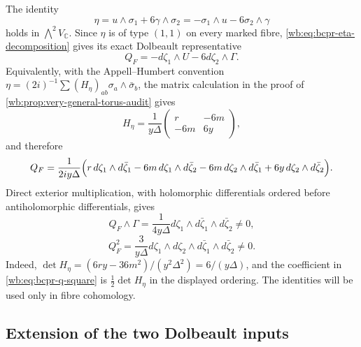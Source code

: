 The identity
\begin{equation}
 \eta=u\wedge\sigma_1+6\gamma\wedge\sigma_2
     =-\sigma_1\wedge u-6\sigma_2\wedge\gamma
\label{wb:eq:bcpr-eta-decomposition}
\end{equation}
holds in $\bigwedge^2V_{\mathbb C}$.  Since $\eta$ is of type $(1,1)$
on every marked fibre, \cref{wb:eq:bcpr-eta-decomposition} gives its exact
Dolbeault representative
\begin{equation}
 Q_F=-d\zeta_1\wedge U-6d\zeta_2\wedge\Gamma.
\label{wb:eq:bcpr-q-fibre}
\end{equation}
Equivalently, with the Appell--Humbert convention
$\eta=(2i)^{-1}\sum(H_\eta)_{ab}\sigma_a\wedge\bar\sigma_b$, the matrix
calculation in the proof of \cref{wb:prop:very-general-torus-audit} gives
\begin{equation}
 H_\eta=\frac1{y\Delta}
 \begin{pmatrix}r&-6m\\-6m&6y\end{pmatrix},
\label{wb:eq:bcpr-appell-humbert-matrix}
\end{equation}
and therefore
\begin{equation}
 Q_F=\frac1{2iy\Delta}\Bigl(
 r\,d\zeta_1\wedge d\bar\zeta_1
 -6m\,d\zeta_1\wedge d\bar\zeta_2
 -6m\,d\zeta_2\wedge d\bar\zeta_1
 +6y\,d\zeta_2\wedge d\bar\zeta_2\Bigr).
\label{wb:eq:bcpr-q-fibre-expanded}
\end{equation}
Direct exterior multiplication, with holomorphic differentials ordered
before antiholomorphic differentials, gives
\begin{equation}
 Q_F\wedge\Gamma
 =\frac1{4y\Delta}
 d\zeta_1\wedge d\bar\zeta_1\wedge d\bar\zeta_2\neq0,
\label{wb:eq:bcpr-q-gamma-product}
\end{equation}
\begin{equation}
 Q_F^2
 =\frac3{y\Delta}
 d\zeta_1\wedge d\zeta_2\wedge
 d\bar\zeta_1\wedge d\bar\zeta_2\neq0.
\label{wb:eq:bcpr-q-square}
\end{equation}
Indeed,
$\det H_\eta=(6ry-36m^2)/(y^2\Delta^2)=6/(y\Delta)$,
and the coefficient in \cref{wb:eq:bcpr-q-square} is
$\tfrac12\det H_\eta$ in the displayed ordering.  The identities
 will be used only in
fibre cohomology.

\subsection{Extension of the two Dolbeault inputs}

